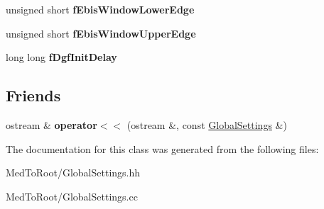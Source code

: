 \begin{DoxyCompactItemize}
\item 
\mbox{\label{class_global_settings_a7ec5e9d460b0b4571c04ad7c6ae783ee}} 
unsigned short {\bfseries f\+Ebis\+Window\+Lower\+Edge}
\item 
\mbox{\label{class_global_settings_a72672076f3067f6866a4843f51e5311f}} 
unsigned short {\bfseries f\+Ebis\+Window\+Upper\+Edge}
\item 
\mbox{\label{class_global_settings_abc519c30d68b6a40a89850064cda3c64}} 
long long {\bfseries f\+Dgf\+Init\+Delay}
\end{DoxyCompactItemize}
\subsection*{Friends}
\begin{DoxyCompactItemize}
\item 
\mbox{\label{class_global_settings_ac6ab153308b559e7d080396b0fc7183b}} 
ostream \& {\bfseries operator$<$$<$} (ostream \&, const \hyperlink{class_global_settings}{Global\+Settings} \&)
\end{DoxyCompactItemize}


The documentation for this class was generated from the following files\+:\begin{DoxyCompactItemize}
\item 
Med\+To\+Root/Global\+Settings.\+hh\item 
Med\+To\+Root/Global\+Settings.\+cc\end{DoxyCompactItemize}
